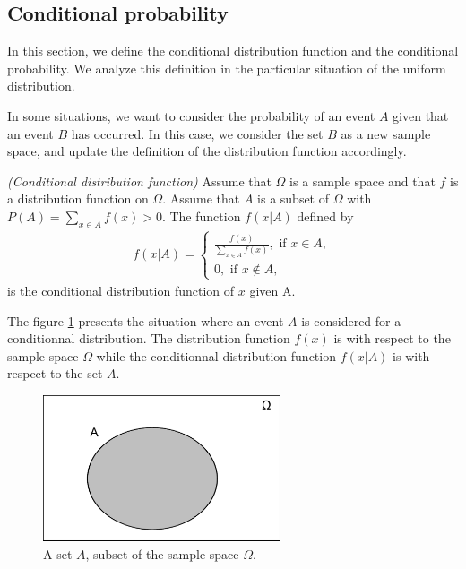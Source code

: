 \subsection{Conditional probability}

In this section, we define the conditional distribution function and
the conditional probability.
We analyze this definition in the particular situation of the 
uniform distribution.

In some situations, we want to consider the probability of 
an event $A$ given that an event $B$ has occurred. 
In this case, we consider the set $B$ as a new sample space, 
and update the definition of the distribution function accordingly.

\begin{definition}
\emph{(Conditional distribution function)}
\label{introstats-conddistribution}
Assume that $\Omega$ is a sample space and that $f$ is a distribution
function on $\Omega$.  
Assume that $A$ is a subset of $\Omega$ with $P(A)=\sum_{x\in A} f(x)>0$.
The function $f(x|A)$ defined by
\begin{eqnarray}
\label{introstats-eq-conddistrib}
f(x|A) = \left\{
\begin{array}{l}
\frac{f(x)}{\sum_{x\in A} f(x)}, \textrm{ if }  x\in A,\\
0, \textrm{ if } x\notin A,
\end{array}
\right.
\end{eqnarray}
is the conditional distribution function of $x$ given A.
\end{definition}

The figure \ref{fig-introstats-onesetA} presents the situation where 
an event $A$ is considered for a conditionnal distribution.
The distribution function $f(x)$ is with respect to the sample 
space $\Omega$ while the conditionnal distribution function $f(x|A)$ 
is with respect to the set $A$.

\begin{figure}
\begin{center}
\includegraphics[width=7cm]{introdiscreteprobas/sets-setA.pdf}
\end{center}
\caption{A set $A$, subset of the sample space $\Omega$.}
\label{fig-introstats-onesetA}
\end{figure}

